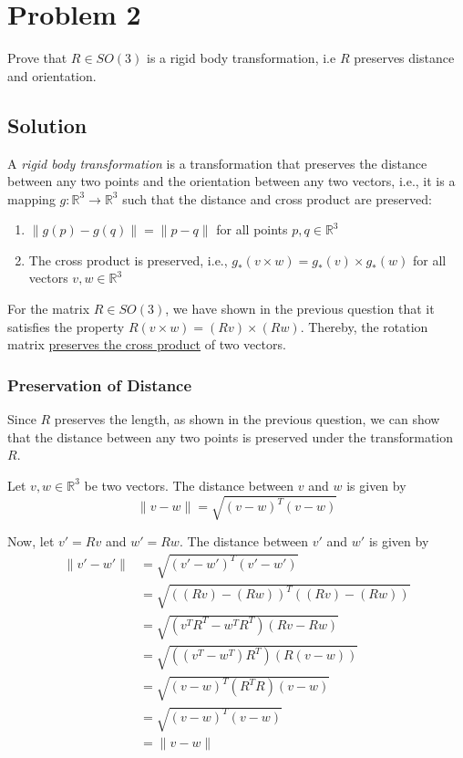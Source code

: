 \section*{Problem 2}

Prove that \(R \in S O(3)\) is a rigid body transformation, i.e \(R\) preserves distance and orientation.

\subsection*{Solution}

A \textit{rigid body transformation} is a transformation that preserves the distance between any two points and the orientation between any two vectors, i.e., it is a mapping \( g: \mathbb{R}^{3} \rightarrow \mathbb{R}^{3} \) such that the distance and cross product are preserved:
\begin{enumerate}
    \item \( \lVert g(p) - g(q) \rVert = \lVert p - q \rVert \) for all points \( p, q \in \mathbb{R}^{3} \)
    \item The cross product is preserved, i.e., \( g_{*}(v \times w) = g_{*}(v) \times g_{*}(w) \) for all vectors \( v, w \in \mathbb{R}^{3} \)
\end{enumerate}

For the matrix \( R \in S O(3) \), we have shown in the previous question that it satisfies the property \( R(v \times w) = (R v) \times (R w) \).
Thereby, the rotation matrix \underline{preserves the cross product} of two vectors.

\subsubsection*{Preservation of Distance}

Since \( R \) preserves the length, as shown in the previous question, we can show that the distance between any two points is preserved under the transformation \( R \).

Let \(v, w \in \mathbb{R}^{3}\) be two vectors. The distance between \(v\) and \(w\) is given by
\[
    \lVert v - w \rVert = \sqrt{{(v - w)}^{T}(v - w)}
\]

Now, let \(v' = R v\) and \(w' = R w\). The distance between \(v'\) and \(w'\) is given by
\begin{align*}
    \lVert v' - w' \rVert
     & = \sqrt{{(v' - w')}^{T}(v' - w')}
    \\ & = \sqrt{{((R v) - (R w))}^{T}((R v) - (R w))}
    \\ & = \sqrt{(v^{T} R^{T} - w^{T} R^{T})(R v - R w)}
    \\ & = \sqrt{((v^{T} - w^{T})R^{T}) (R(v - w))}
    \\ & = \sqrt{{(v - w)}^{T} (R^{T} R) (v - w)}
    \\ & = \sqrt{{(v - w)}^{T} (v - w)}
    \\ & = \lVert v - w \rVert
\end{align*}

